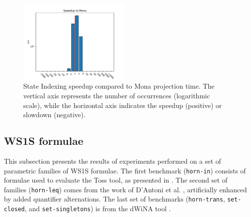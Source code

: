 \documentclass[pdflatex,sn-mathphys-num]{sn-jnl}%
\theoremstyle{thmstyleone}%
\theoremstyle{thmstyletwo}%
\theoremstyle{thmstylethree}%
\begin{document}
            \vspace*{-3em}

            \begin{figure}[h!]
                \centering
                \includegraphics[width=0.49\textwidth]{Figures/projection-first-speedup.pdf}
                \caption{State Indexing speedup compared to Mona projection time. The vertical axis represents the number of occurrences (logarithmic scale), while the horizontal axis indicates the speedup (positive) or slowdown (negative).}
                \label{figure:projection_first_speedup}
            \end{figure}

    \vspace*{-2em}

    \subsection{WS1S formulae}
        This subsection presents the results of experiments performed on a set of parametric families of WS1S formulae. The first benchmark (\texttt{horn-in}) consists of formulae used to evaluate the Toss tool, as presented in \cite{TOSS}. The second set of families (\texttt{horn-leq}) comes from the work of D'Antoni et al. \cite{DAntoni}, artificially enhanced by added quantifier alternations. The last set of benchmarks (\texttt{horn-trans}, \texttt{set-closed}, and \texttt{set-singletons}) is from the dWiNA tool \cite{dWiNA}.
\end{document}
